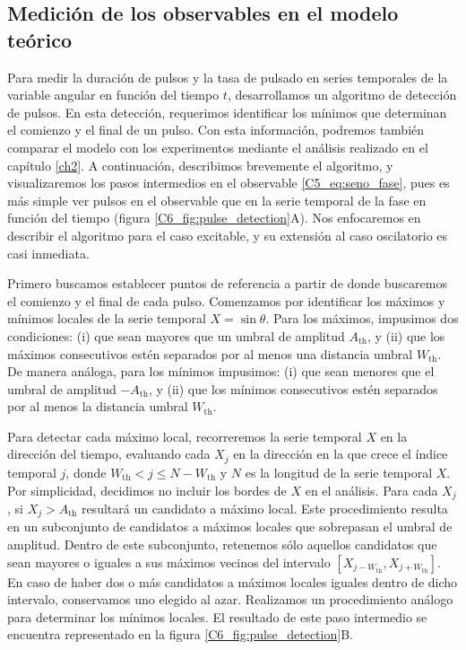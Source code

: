 \documentclass[./main.tex]{subfiles}
\begin{document}
\subsection{Medición de los observables en el modelo teórico}
\label{C6_ssec:deteccion_de_pulsos}

Para medir la duración de pulsos y la tasa de pulsado en series temporales de la variable angular \xx en función del tiempo $t$, desarrollamos un algoritmo de detección de pulsos. En esta detección, requerimos identificar los mínimos que determinan el comienzo y el final de un pulso. Con esta información, podremos también comparar el modelo con los experimentos mediante el análisis realizado en el capítulo \ref{ch2}. A continuación, describimos brevemente el algoritmo, y visualizaremos los pasos intermedios en el observable \ref{C5_eq:seno_fase}, pues es más simple ver pulsos en el observable que en la serie temporal de la fase en función del tiempo (figura \ref{C6_fig:pulse_detection}A). Nos enfocaremos en describir el algoritmo para el caso excitable, y su extensión al caso oscilatorio es casi inmediata.


Primero buscamos establecer puntos de referencia a partir de donde buscaremos el comienzo y el final de cada pulso. Comenzamos por identificar los máximos y mínimos locales de la serie temporal $X = \sin{\theta}$. Para los máximos, impusimos dos condiciones: (i) que sean mayores que un umbral de amplitud $A_{\text{th}}$, y (ii) que los máximos consecutivos estén separados por al menos una distancia umbral $W_{\text{th}}$. De manera análoga, para los mínimos impusimos: (i) que sean menores que el umbral de amplitud $-A_{\text{th}}$, y (ii) que los mínimos consecutivos estén separados por al menos la distancia umbral $W_{\text{th}}$. 


Para detectar cada máximo local, recorreremos la serie temporal $X$ en la dirección del tiempo, evaluando cada $X_j$ en la dirección en la que crece el índice temporal $j$, donde $W_{\text{th}} < j \leq N - W_{\text{th}}$ y $N$ es la longitud de la serie temporal $X$. Por simplicidad, decidimos no incluir los bordes de $X$ en el análisis. Para cada $X_j$, si $X_j > A_{\text{th}}$ resultará un candidato a máximo local. Este procedimiento resulta en un subconjunto de candidatos a máximos locales que sobrepasan el umbral de amplitud. Dentro de este subconjunto, retenemos sólo aquellos candidatos que sean mayores o iguales a sus máximos vecinos del intervalo $\left[ X_{j-W_{\text{th}}},X_{j+W_{\text{th}}}\right]$. En caso de haber dos o más candidatos a máximos locales iguales dentro de dicho intervalo, conservamos uno elegido al azar. Realizamos un procedimiento análogo para determinar los mínimos locales. El resultado de este paso intermedio se encuentra representado en la figura \ref{C6_fig:pulse_detection}B.
 
\end{document}
